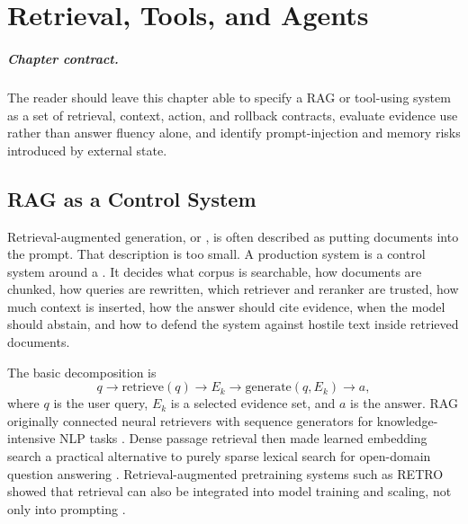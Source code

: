 \chapter{Retrieval, Tools, and Agents}
\label{ch:retrieval-tools-agents}


\paragraph{Chapter contract.} The reader should leave this chapter able to specify a RAG or tool-using system as a set of retrieval, context, action, and rollback contracts, evaluate evidence use rather than answer fluency alone, and identify prompt-injection and memory risks introduced by external state.

\section{RAG as a Control System}
\label{sec:rag-control-system}

Retrieval-augmented generation, or \rag, is often described as putting documents into the prompt. That description is too small. A production \rag system is a control system around a \llm. It decides what corpus is searchable, how documents are chunked, how queries are rewritten, which retriever and reranker are trusted, how much context is inserted, how the answer should cite evidence, when the model should abstain, and how to defend the system against hostile text inside retrieved documents.

The basic decomposition is
\begin{equation}
  q \rightarrow \mathrm{retrieve}(q) \rightarrow E_k
  \rightarrow \mathrm{generate}(q,E_k) \rightarrow a,
  \label{eq:rag-pipeline}
\end{equation}
where $q$ is the user query, $E_k$ is a selected evidence set, and $a$ is the answer. RAG originally connected neural retrievers with sequence generators for knowledge-intensive NLP tasks \cite{lewis2020retrieval}. Dense passage retrieval then made learned embedding search a practical alternative to purely sparse lexical search for open-domain question answering \cite{karpukhin2020dense}. Retrieval-augmented pretraining systems such as RETRO showed that retrieval can also be integrated into model training and scaling, not only into prompting \cite{borgeaud2022retro}.

